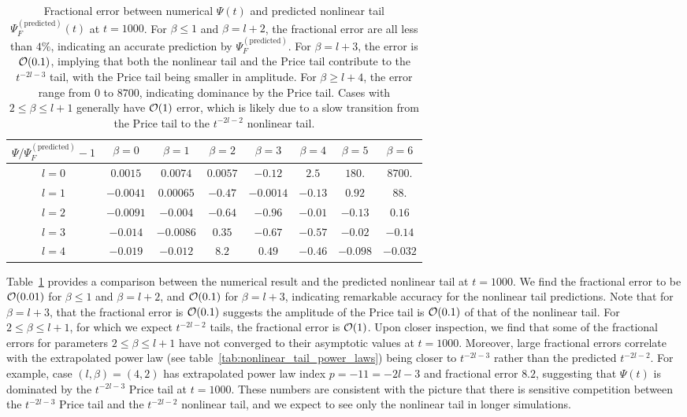 \documentclass[reprint,aps,physrev,superscriptaddress,10pt,notitlepage,prd,nofootinbib,onecolumn]{revtex4-2}
\newcommand{\tref}[1]{table~\ref{#1}}
\newcommand{\Tref}[1]{Table~\ref{#1}}
\begin{document}
\begin{table}[t]
  \centering
  \begin{tabular}{|c|c|c|c|c|c|c|c|}
    \hline
    $ \Psi / \Psi_F^{\mathrm{(predicted)}} - 1$ & $\beta=0$ & $\beta=1$ & $\beta=2$ & $\beta=3$ & $\beta=4$ & $\beta=5$ & $\beta=6$ \\
    \hline
    $l=0$ & $0.0015$ & $0.0074$ & $0.0057$ & $-0.12$ & $2.5$ & $180.$ & $8700.$\\
    $l=1$ & $-0.0041$ & $0.00065$ & $-0.47$ & $-0.0014$ & $-0.13$ & $0.92$ & $88.$\\
    $l=2$ & $-0.0091$ & $-0.004$ & $-0.64$ & $-0.96$ & $-0.01$ & $-0.13$ & $0.16$\\
    $l=3$ & $-0.014$ & $-0.0086$ & $0.35$ & $-0.67$ & $-0.57$ & $-0.02$ & $-0.14$\\
    $l=4$ & $-0.019$ & $-0.012$ & $8.2$ & $0.49$ & $-0.46$ & $-0.098$ & $-0.032$ \\
    \hline
  \end{tabular}
  \caption{Fractional error between numerical $\Psi(t)$ and predicted nonlinear tail $\Psi_F^{\mathrm{(predicted)}}(t)$ at $t = 1000$.
    For $\beta \leq 1$ and $\beta = l+2$, the fractional error are all less than $4\%$, indicating an accurate prediction by $\Psi_F^{\mathrm{(predicted)}}$.
    For $\beta = l+3$, the error is $\order{0.1}$, implying that both the nonlinear tail and the Price tail contribute to the $t^{-2l-3}$ tail, with the Price tail being smaller in amplitude.
    For $\beta \geq l+4$, the error range from $0$ to $8700$, indicating dominance by the Price tail.
    Cases with $2 \leq \beta \leq l+1$ generally have $\order{1}$ error, which is likely due to a slow transition from the Price tail to the $t^{-2l-2}$ nonlinear tail.
  }
  \label{tab:nonlinear_tail_amplitude_comparison}
\end{table}

\Tref{tab:nonlinear_tail_amplitude_comparison} provides a comparison between the numerical result and the predicted nonlinear tail at $t=1000$.
We find the fractional error to be $\order{0.01}$ for $\beta \leq 1$ and $\beta = l+2$, and $\order{0.1}$ for $\beta = l+3$, indicating remarkable accuracy for the nonlinear tail predictions.
Note that for $\beta = l+3$, that the fractional error is $\order{0.1}$ suggests the amplitude of the Price tail is $\order{0.1}$ of that of the nonlinear tail.
For $2 \leq \beta \leq l+1$, for which we expect $t^{-2l-2}$ tails, the fractional error is $\order{1}$.
Upon closer inspection, we find that some of the fractional errors for parameters $2 \leq \beta \leq l+1$ have not converged to their asymptotic values at $t=1000$.
Moreover, large fractional errors correlate with the extrapolated power law (see \tref{tab:nonlinear_tail_power_laws}) being closer to $t^{-2l-3}$ rather than the predicted $t^{-2l-2}$.
For example, case $(l,\beta) = (4,2)$ has extrapolated power law index $p=-11=-2l-3$ and fractional error $8.2$, suggesting that $\Psi(t)$ is dominated by the $t^{-2l-3}$ Price tail at $t=1000$.
These numbers are consistent with the picture that there is sensitive competition between the $t^{-2l-3}$ Price tail and the $t^{-2l-2}$ nonlinear tail, and we expect to see only the nonlinear tail in longer simulations.
\end{document}

